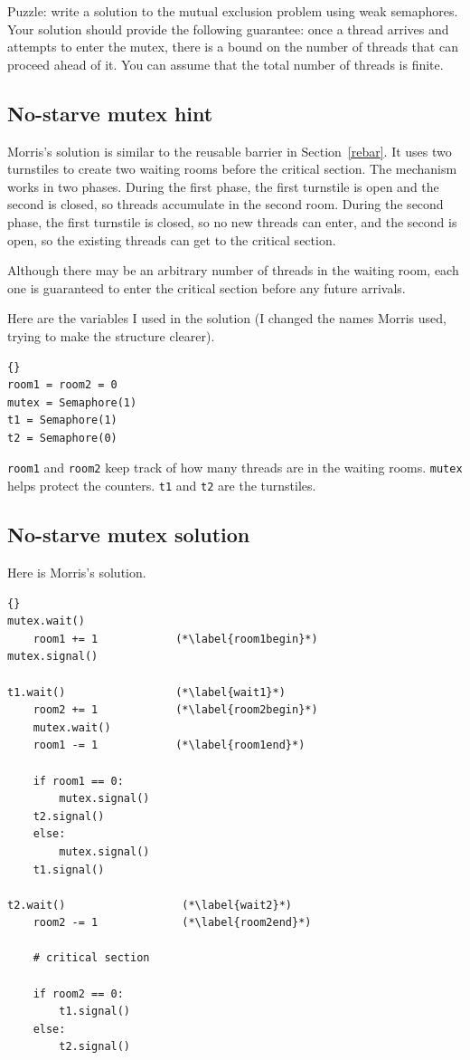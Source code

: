 \documentclass{book}
\begin{document}
Puzzle: write a solution to the mutual exclusion problem using weak
semaphores.  Your solution should provide the following guarantee:
once a thread arrives and attempts to enter the mutex, there is a
bound on the number of threads that can proceed ahead of it.  You can
assume that the total number of threads is finite.



\subsection{No-starve mutex hint}
\label{morris}

Morris's solution is similar to the reusable barrier in
Section~\ref{rebar}.  It uses two turnstiles to create two waiting
rooms before the critical section.  The mechanism works in two phases.
During the first phase, the first turnstile is open and the second is
closed, so threads accumulate in the second room.  During the second
phase, the first turnstile is closed, so no new threads can enter, and
the second is open, so the existing threads can get to the critical
section.

Although there may be an arbitrary number of threads in the waiting
room, each one is guaranteed to enter the critical section before any
future arrivals.

Here are the variables I used in the solution (I changed the
names Morris used, trying to make the structure clearer).

\begin{lstlisting}[title={No-starve mutex hint}]{}
room1 = room2 = 0
mutex = Semaphore(1)
t1 = Semaphore(1)
t2 = Semaphore(0)
\end{lstlisting}

{\tt room1} and {\tt room2} keep track of how many threads are in the
waiting rooms.  {\tt mutex} helps protect the counters.  {\tt t1} and
    {\tt t2} are the turnstiles.



\subsection{No-starve mutex solution}

Here is Morris's solution.

\begin{lstlisting}[title={Morris's algorithm}]{}
mutex.wait()
    room1 += 1            (*\label{room1begin}*)
mutex.signal()
                           
t1.wait()                 (*\label{wait1}*)
    room2 += 1            (*\label{room2begin}*)
    mutex.wait()
    room1 -= 1            (*\label{room1end}*)

    if room1 == 0: 
        mutex.signal()
	t2.signal()
    else: 
        mutex.signal()
	t1.signal()

t2.wait()                  (*\label{wait2}*)
    room2 -= 1             (*\label{room2end}*)

    # critical section

    if room2 == 0:
        t1.signal()
    else:
        t2.signal()
\end{lstlisting}
\end{document}
